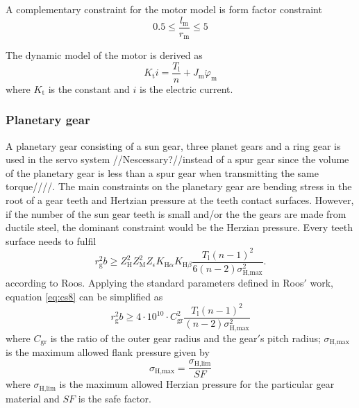 A complementary constraint for the motor model is form factor constraint
\begin{equation} \label{eq:cs6}
0.5 \leq \frac{l_{\text{m}}}{r_{\text{m}}} \leq 5
\end{equation}

The dynamic model of the motor is derived as
\begin{equation} \label{eq:cs7}
K_{\text{t}}i= \frac{T_{\text{l}}}{n} + J_{\text{m}}\ddot{{\varphi}}_{\text{m}}
\end{equation}
where $K_{\text{t}}$ is the constant and $i$ is the electric current.


\subsubsection*{Planetary gear}
A planetary gear consisting of a sun gear, three planet gears and a ring gear is used in the servo system //Nescessary?//instead of a spur gear since the volume of the planetary gear is less than a spur gear when transmitting the same torque////. The main constraints on the planetary gear are bending stress in the root of a gear teeth and Hertzian pressure at the teeth contact surfaces. However, if the number of the sun gear teeth is small and/or the the gears are made from ductile steel, the dominant constraint would be the Herzian pressure. Every teeth surface needs to fulfil 
\begin{equation} \label{eq:cs8}
r_{\text{g}}^2b \geq Z_{\text{H}}^2 Z_{\text{M}}^2 Z_{\epsilon} K_{\text{H} \alpha} K_{\text{H} \beta} \frac{T_{\text{l}}(n-1)^2}{6(n-2)\sigma_{\text{H,max}}^2}.
\end{equation}
according to Roos. Applying the standard parameters defined in Roos$'$ work, equation \ref{eq:cs8} can be simplified as
\begin{equation} \label{eq:cs9}
r_{\text{g}}^2b \geq 4\cdot10^{10} \cdot C_{\text{gr}}^2\frac{T_{\text{l}}(n-1)^2}{(n-2)\sigma_{\text{H,max}}^2}
\end{equation}
where $C_{\text{gr}}$ is the ratio of the outer gear radius and the gear$'$s pitch radius; $\sigma_{\text{H,max}}$ is the maximum allowed flank pressure given by
\begin{equation} \label{eq:cs10}
\sigma_{\text{H,max}}=\frac{\sigma_{\text{H,lim}}}{SF}
\end{equation}
where $\sigma_{\text{H,lim}}$ is the maximum allowed Herzian pressure for the particular gear material and $SF$ is the safe factor.

